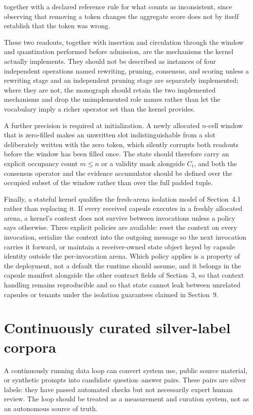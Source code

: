 \documentclass[11pt]{article}
\begin{document}
together with a declared reference rule for what counts as inconsistent, since observing that removing a token changes the aggregate score does not by itself establish that the token was wrong.

These two readouts, together with insertion and circulation through the window and quantization performed before admission, are the mechanisms the kernel actually implements. They should not be described as instances of four independent operations named rewriting, pruning, consensus, and scoring unless a rewriting stage and an independent pruning stage are separately implemented; where they are not, the monograph should retain the two implemented mechanisms and drop the unimplemented role names rather than let the vocabulary imply a richer operator set than the kernel provides.

A further precision is required at initialization. A newly allocated $n$-cell window that is zero-filled makes an unwritten slot indistinguishable from a slot deliberately written with the zero token, which silently corrupts both readouts before the window has been filled once. The state should therefore carry an explicit occupancy count $m \leq n$ or a validity mask alongside $C_t$, and both the consensus operator and the evidence accumulator should be defined over the occupied subset of the window rather than over the full padded tuple.

Finally, a stateful kernel qualifies the fresh-arena isolation model of Section~4.1 rather than replacing it. If every received capsule executes in a freshly allocated arena, a kernel's context does not survive between invocations unless a policy says otherwise. Three explicit policies are available: reset the context on every invocation, serialize the context into the outgoing message so the next invocation carries it forward, or maintain a receiver-owned state object keyed by capsule identity outside the per-invocation arena. Which policy applies is a property of the deployment, not a default the runtime should assume, and it belongs in the capsule manifest alongside the other contract fields of Section~3, so that context handling remains reproducible and so that state cannot leak between unrelated capsules or tenants under the isolation guarantees claimed in Section~9.

\section{Continuously curated silver-label corpora}
A continuously running data loop can convert system use, public source material, or synthetic prompts into candidate question--answer pairs. These pairs are silver labels: they have passed automated checks but not necessarily expert human review. The loop should be treated as a measurement and curation system, not as an autonomous source of truth.
\end{document}
